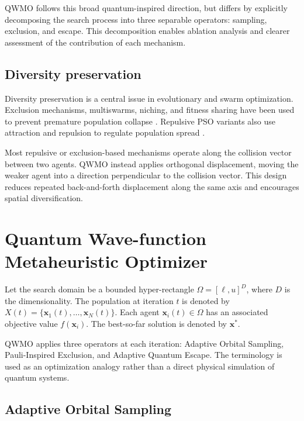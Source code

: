 \documentclass[final,5p,times,twocolumn]{elsarticle}
\begin{document}
QWMO follows this broad quantum-inspired direction, but differs
by explicitly decomposing the search process into three
separable operators: sampling, exclusion, and escape. This
decomposition enables ablation analysis and clearer assessment
of the contribution of each mechanism.

\subsection{Diversity preservation}

Diversity preservation is a central issue in evolutionary and
swarm optimization. Exclusion mechanisms, multiswarms, niching,
and fitness sharing have been used to prevent premature
population collapse \cite{blackwell2006multiswarm,
sareni1998fitness}. Repulsive PSO variants also use attraction
and repulsion to regulate population spread
\cite{mullen2007orienteering}.

Most repulsive or exclusion-based mechanisms operate along
the collision vector between two agents. QWMO instead applies
orthogonal displacement, moving the weaker agent into a
direction perpendicular to the collision vector. This design
reduces repeated back-and-forth displacement along the same
axis and encourages spatial diversification.


\section{Quantum Wave-function Metaheuristic Optimizer}
\label{sec:method}

Let the search domain be a bounded hyper-rectangle
$\Omega=[\ell,u]^D$, where $D$ is the dimensionality.
The population at iteration $t$ is denoted by
$X(t)=\{\mathbf{x}_1(t),\dots,\mathbf{x}_N(t)\}$.
Each agent $\mathbf{x}_i(t)\in\Omega$ has an associated
objective value $f(\mathbf{x}_i)$.
The best-so-far solution is denoted by $\mathbf{x}^{*}$.

QWMO applies three operators at each iteration:
Adaptive Orbital Sampling, Pauli-Inspired Exclusion, and
Adaptive Quantum Escape. The terminology is used as an
optimization analogy rather than a direct physical simulation
of quantum systems.

\subsection{Adaptive Orbital Sampling}
\end{document}
